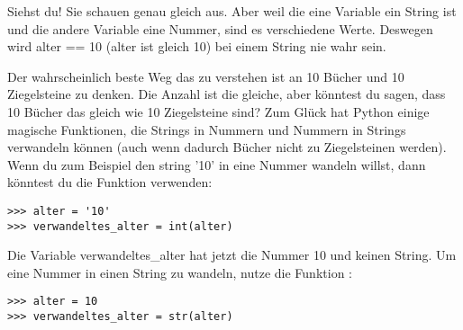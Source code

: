 Siehst du! Sie schauen genau gleich aus. Aber weil die eine Variable ein String ist und die andere Variable eine Nummer, sind es verschiedene Werte. Deswegen wird alter == 10 (alter ist gleich 10) bei einem String nie wahr sein.
\par
Der wahrscheinlich beste Weg das zu verstehen ist an 10 Bücher und 10 Ziegelsteine zu denken. Die Anzahl ist die gleiche, aber könntest du sagen, dass 10 Bücher das gleich wie 10 Ziegelsteine sind? Zum Glück hat Python einige magische Funktionen, die Strings in Nummern und Nummern in Strings verwandeln können (auch wenn dadurch Bücher nicht zu Ziegelsteinen werden). Wenn du zum Beispiel den string '10' in eine Nummer wandeln willst, dann könntest du die Funktion  verwenden:

\begin{Verbatim}[frame=single]
>>> alter = '10'
>>> verwandeltes_alter = int(alter)
\end{Verbatim}

\noindent
Die Variable verwandeltes\_alter hat jetzt die Nummer 10 und keinen String. Um eine Nummer in einen String zu wandeln, nutze die Funktion :

\begin{Verbatim}[frame=single]
>>> alter = 10
>>> verwandeltes_alter = str(alter)
\end{Verbatim}

